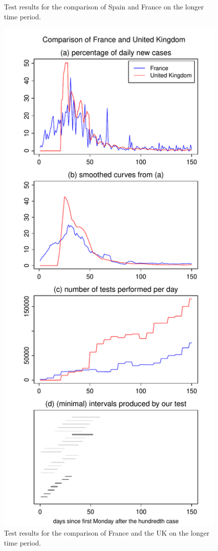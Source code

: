 \documentclass[a4paper,12pt]{article}
\numberwithin{equation}{section}
\begin{document}
\begin{figure}[p!]
\begin{minipage}[t]{0.49\textwidth}
\caption{Test results for the comparison of Spain and France on the longer time period.}
\end{minipage}
\hspace{0.25cm}
\begin{minipage}[t]{0.49\textwidth}
\includegraphics[width=\textwidth]{plots/FRA_vs_GBR_normalised}
\caption{Test results for the comparison of France and the UK on the longer time period.}\label{fig:supp4:last}
\end{minipage}
\end{figure}
\end{document}
